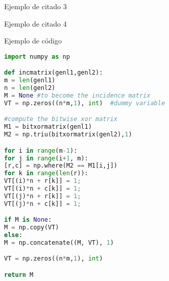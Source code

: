 Ejemplo de citado 3 \cite{baggio}

Ejemplo de citado 4 

Ejemplo de código

\begin{lstlisting}[language=Python, caption=Python example]
import numpy as np

def incmatrix(genl1,genl2):
m = len(genl1)
n = len(genl2)
M = None #to become the incidence matrix
VT = np.zeros((n*m,1), int)  #dummy variable

#compute the bitwise xor matrix
M1 = bitxormatrix(genl1)
M2 = np.triu(bitxormatrix(genl2),1) 

for i in range(m-1):
for j in range(i+1, m):
[r,c] = np.where(M2 == M1[i,j])
for k in range(len(r)):
VT[(i)*n + r[k]] = 1;
VT[(i)*n + c[k]] = 1;
VT[(j)*n + r[k]] = 1;
VT[(j)*n + c[k]] = 1;

if M is None:
M = np.copy(VT)
else:
M = np.concatenate((M, VT), 1)

VT = np.zeros((n*m,1), int)

return M
\end{lstlisting}